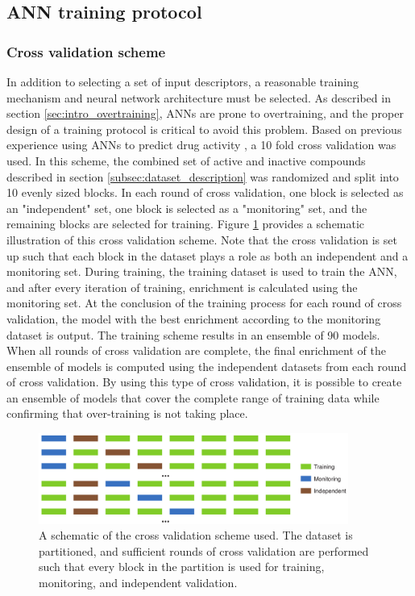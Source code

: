 \subsection{ANN training protocol}

\subsubsection{Cross validation scheme}
In addition to selecting a set of input descriptors, a reasonable training mechanism and neural network architecture must be selected.
As described in section \ref{sec:intro_overtraining}, \ac{ANN}s are prone to overtraining, and the proper design of a training protocol is critical to avoid this problem.
Based on previous experience using \ac{ANN}s to predict drug activity \citep{Mueller:2010dx,Mueller:2012gn,Butkiewicz:2013ka}, a 10 fold cross validation was used.
In this scheme, the combined set of active and inactive compounds described in section \ref{subsec:dataset_description} was randomized and split into 10 evenly sized blocks.
In each round of cross validation, one block is selected as an "independent" set, one block is selected as a "monitoring" set, and the remaining blocks are selected for training.
Figure \ref{fig:crossval_schematic} provides a schematic illustration of this cross validation scheme.
Note that the cross validation is set up such that each block in the dataset plays a role as both an independent and a monitoring set.
During training, the training dataset is used to train the \ac{ANN}, and after every iteration of training, enrichment is calculated using the monitoring set.
At the conclusion of the training process for each round of cross validation, the model with the best enrichment according to the monitoring dataset is output.
The training scheme results in an ensemble of 90 models.
When all rounds of cross validation are complete, the final enrichment of the ensemble of models is computed using the independent datasets from each round of cross validation.
By using this type of cross validation, it is possible to create an ensemble of models that cover the complete range of training data while confirming that over-training is not taking place.
\begin{figure}
\centering
\includegraphics[width=4in]{figures/hts/cross_validation.pdf}
\caption{
A schematic of the cross validation scheme used.
The dataset is partitioned, and sufficient rounds of cross validation are performed such that every block in the partition is used for training, monitoring, and independent validation.
}
\label{fig:crossval_schematic}
\end{figure}

